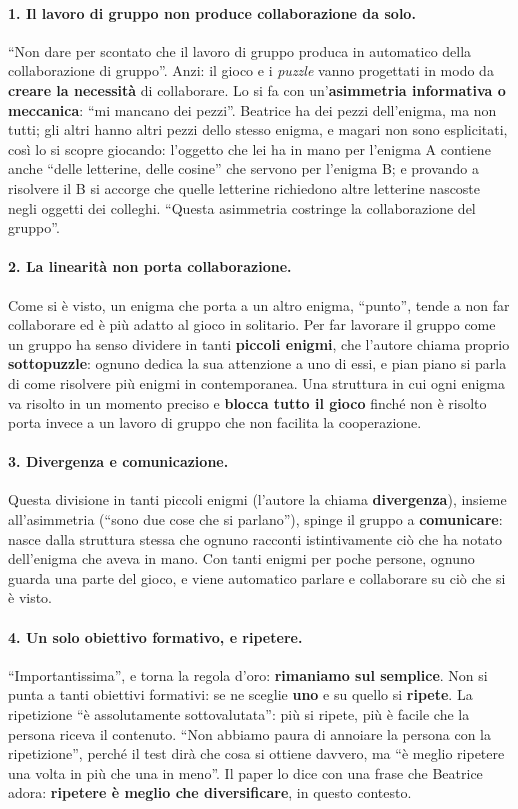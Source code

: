 \paragraph{1. Il lavoro di gruppo non produce collaborazione da solo.} ``Non dare per
scontato che il lavoro di gruppo produca in automatico della collaborazione di
gruppo''. Anzi: il gioco e i \emph{puzzle} vanno progettati in modo da \textbf{creare
la necessità} di collaborare. Lo si fa con un'\textbf{asimmetria informativa o
meccanica}: ``mi mancano dei pezzi''. Beatrice ha dei pezzi dell'enigma, ma non tutti;
gli altri hanno altri pezzi dello stesso enigma, e magari non sono esplicitati, così
lo si scopre giocando: l'oggetto che lei ha in mano per l'enigma A contiene anche
``delle letterine, delle cosine'' che servono per l'enigma B; e provando a risolvere
il B si accorge che quelle letterine richiedono altre letterine nascoste negli oggetti
dei colleghi. ``Questa asimmetria costringe la collaborazione del gruppo''.

\paragraph{2. La linearità non porta collaborazione.} Come si è visto, un enigma che
porta a un altro enigma, ``punto'', tende a non far collaborare ed è più adatto al
gioco in solitario. Per far lavorare il gruppo come un gruppo ha senso dividere in
tanti \textbf{piccoli enigmi}, che l'autore chiama proprio \textbf{sottopuzzle}: ognuno
dedica la sua attenzione a uno di essi, e pian piano si parla di come risolvere più
enigmi in contemporanea. Una struttura in cui ogni enigma va risolto in un momento
preciso e \textbf{blocca tutto il gioco} finché non è risolto porta invece a un lavoro
di gruppo che non facilita la cooperazione.

\paragraph{3. Divergenza e comunicazione.} Questa divisione in tanti piccoli enigmi
(l'autore la chiama \textbf{divergenza}), insieme all'asimmetria (``sono due cose che si
parlano''), spinge il gruppo a \textbf{comunicare}: nasce dalla struttura stessa che
ognuno racconti istintivamente ciò che ha notato dell'enigma che aveva in mano. Con
tanti enigmi per poche persone, ognuno guarda una parte del gioco, e viene automatico
parlare e collaborare su ciò che si è visto.

\paragraph{4. Un solo obiettivo formativo, e ripetere.} ``Importantissima'', e torna
la regola d'oro: \textbf{rimaniamo sul semplice}. Non si punta a tanti obiettivi
formativi: se ne sceglie \textbf{uno} e su quello si \textbf{ripete}. La ripetizione
``è assolutamente sottovalutata'': più si ripete, più è facile che la persona riceva il
contenuto. ``Non abbiamo paura di annoiare la persona con la ripetizione'', perché il
test dirà che cosa si ottiene davvero, ma ``è meglio ripetere una volta in più che una
in meno''. Il paper lo dice con una frase che Beatrice adora: \textbf{ripetere è meglio
che diversificare}, in questo contesto.

